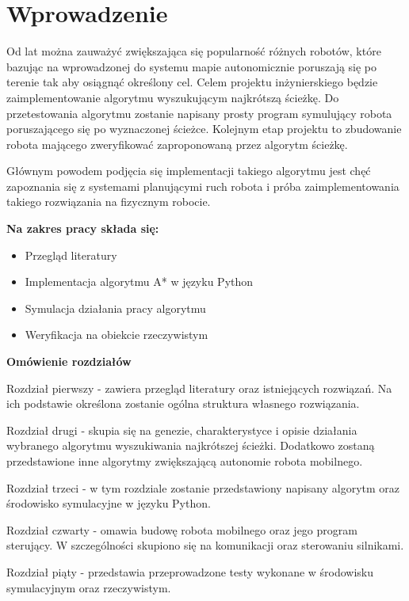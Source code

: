 \section{Wprowadzenie}
Od lat można zauważyć zwiększająca się popularność różnych robotów, które bazując na wprowadzonej do systemu mapie
autonomicznie poruszają się po terenie tak aby osiągnąć określony cel.
Celem projektu inżynierskiego będzie zaimplementowanie algorytmu wyszukującym najkrótszą ścieżkę.
Do przetestowania algorytmu zostanie napisany prosty program symulujący robota poruszającego się po wyznaczonej ścieżce.
Kolejnym etap projektu to zbudowanie robota mającego zweryfikować zaproponowaną przez algorytm ścieżkę. 

Głównym powodem podjęcia się implementacji takiego algorytmu jest chęć zapoznania się z systemami planującymi ruch robota
i próba zaimplementowania takiego rozwiązania na fizycznym robocie.


\textbf{Na zakres pracy składa się:}
\begin{itemize}
	\item Przegląd literatury
	\item Implementacja algorytmu A* w języku Python
	\item Symulacja działania pracy algorytmu
	\item Weryfikacja na obiekcie rzeczywistym
\end{itemize}

\textbf{Omówienie rozdziałów}

Rozdział pierwszy - zawiera przegląd literatury oraz istniejących rozwiązań. 
Na ich podstawie określona zostanie ogólna struktura własnego rozwiązania.

Rozdział drugi - skupia się na genezie, charakterystyce i opisie działania wybranego algorytmu wyszukiwania najkrótszej ścieżki.
Dodatkowo zostaną przedstawione inne algorytmy zwiększającą autonomie robota mobilnego.

Rozdział trzeci - w tym rozdziale zostanie przedstawiony napisany algorytm oraz środowisko symulacyjne w języku Python.

Rozdział czwarty - omawia budowę robota mobilnego oraz jego program sterujący.
W szczególności skupiono się na komunikacji oraz sterowaniu silnikami.

Rozdział piąty - przedstawia przeprowadzone testy wykonane w środowisku symulacyjnym oraz rzeczywistym. 